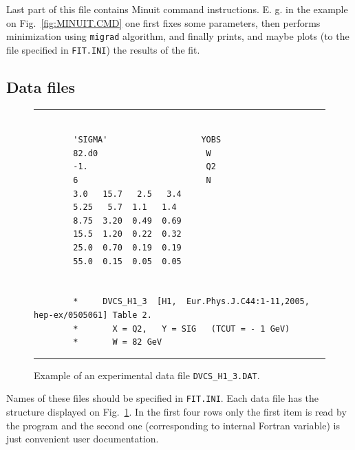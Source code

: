 \documentclass[12pt]{article}
\begin{document}
Last part of this file contains Minuit command instructions. E. g. in the
example on Fig.~\ref{fig:MINUIT.CMD} one first fixes some parameters,
then performs minimization using \texttt{migrad} algorithm,
and finally prints, and maybe plots (to the file specified in
\texttt{FIT.INI}) the results of the fit.

\subsection{Data files}

\begin{figure}[t]
\begin{center}
\hrule
\begin{verbatim}

        'SIGMA'                   YOBS
        82.d0                      W
        -1.                        Q2
        6                          N
        3.0   15.7   2.5   3.4   
        5.25   5.7  1.1   1.4  
        8.75  3.20  0.49  0.69
        15.5  1.20  0.22  0.32
        25.0  0.70  0.19  0.19
        55.0  0.15  0.05  0.05


        *     DVCS_H1_3  [H1,  Eur.Phys.J.C44:1-11,2005, hep-ex/0505061] Table 2.
        *       X = Q2,   Y = SIG   (TCUT = - 1 GeV)
        *       W = 82 GeV

\end{verbatim}
\hrule
\end{center}
\caption{Example of an experimental data file \texttt{DVCS\_H1\_3.DAT}.}
\label{fig:DVCS4.DAT}
\end{figure}

Names of these files should be specified in \texttt{FIT.INI}.
Each data file has the structure displayed on Fig.~\ref{fig:DVCS4.DAT}. In the first
four rows only the first item is read by the program and the second one
(corresponding to internal Fortran variable) is just convenient user
documentation.
\end{document}

